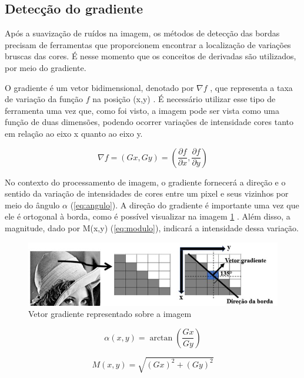 \documentclass[a4paper,alpha-refs]{RBCA_v1.0}
\begin{document}
\subsection{Detecção do gradiente}

Após a suavização de ruídos na imagem, os métodos de detecção das bordas precisam de ferramentas que proporcionem encontrar a localização de variações bruscas das cores. É nesse momento que os conceitos de derivadas são utilizados, por meio do gradiente.

O gradiente é um vetor bidimensional, denotado por $\nabla f$ , que representa a taxa de variação da função $f$ na posição (x,y) \cite[p. 465]{ProcDigital}. É necessário utilizar esse tipo de ferramenta uma vez que, como foi visto, a imagem pode ser vista como uma função de duas dimensões, podendo ocorrer variações de intensidade cores tanto em relação ao eixo x quanto ao eixo y. 

\begin{equation}
\nabla f = (Gx,Gy) = (\frac{\partial f}{\partial x},\frac{\partial f}{\partial y})
\label{eq:gradiente}
\end{equation}

No contexto do processamento de imagem, o gradiente fornecerá a direção e o sentido da variação de intensidades de cores entre um pixel e seus vizinhos por meio do ângulo $\alpha$ (\ref{eq:angulo}). A direção do gradiente é importante uma vez que ele é ortogonal à borda, como é possível visualizar na imagem \ref{img:exemplo1} . Além disso, a magnitude, dado por M(x,y) (\ref{eq:modulo}), indicará a intensidade dessa variação.

\begin{figure}[h!]
	\centering
	\includegraphics[width=.5\textwidth]{img/1-gradiente.jpg}
	\caption{Vetor gradiente representado sobre a imagem}
	\label{img:exemplo1}
\end{figure}

\begin{equation}
\alpha (x,y) = \arctan(\frac{Gx}{Gy}) 
\label{eq:angulo}
\end{equation}

\begin{equation}
M(x,y) = \sqrt{(Gx)^2 + (Gy)^2} 
\label{eq:modulo}
\end{equation}
\end{document}
